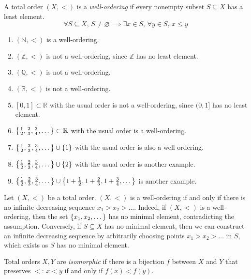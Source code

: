 \begin{definition}
    A total order \( (X, <) \) is a \emph{well-ordering} if every nonempty subset \( S \subseteq X \) has a least element.
    \[ \forall S \subseteq X,\, S \neq \varnothing \implies \exists x \in S,\, \forall y \in S,\, x \leq y \]
\end{definition}
\begin{example}
    \begin{enumerate}
        \item \( (\mathbb N, <) \) is a well-ordering.
        \item \( (\mathbb Z, <) \) is not a well-ordering, since \( \mathbb Z \) has no least element.
        \item \( (\mathbb Q, <) \) is not a well-ordering.
        \item \( (\mathbb R, <) \) is not a well-ordering.
        \item \( [0,1] \subset \mathbb R \) with the usual order is not a well-ordering, since \( (0,1] \) has no least element.
        \item \( \qty{\frac{1}{2}, \frac{2}{3}, \frac{3}{4}, \dots} \subset \mathbb R \) with the usual order is a well-ordering.
        \item \( \qty{\frac{1}{2}, \frac{2}{3}, \frac{3}{4}, \dots} \cup \qty{1} \) with the usual order is also a well-ordering.
        \item \( \qty{\frac{1}{2}, \frac{2}{3}, \frac{3}{4}, \dots} \cup \qty{2} \) with the usual order is another example.
        \item \( \qty{\frac{1}{2}, \frac{2}{3}, \frac{3}{4}, \dots} \cup \qty{1 + \frac{1}{2}, 1 + \frac{2}{3}, 1 + \frac{3}{4}, \dots} \) is another example.
    \end{enumerate}
\end{example}
\begin{remark}
    Let \( (X, <) \) be a total order.
    \( (X, <) \) is a well-ordering if and only if there is no infinite decreasing sequence \( x_1 > x_2 > \dots \).
    Indeed, if \( (X, <) \) is a well-ordering, then the set \( \qty{x_1, x_2, \dots} \) has no minimal element, contradicting the assumption.
    Conversely, if \( S \subseteq X \) has no minimal element, then we can construct an infinite decreasing sequence by arbitrarily choosing points \( x_1 > x_2 > \dots \) in \( S \), which exists as \( S \) has no minimal element.
\end{remark}
\begin{definition}
    Total orders \( X, Y \) are \emph{isomorphic} if there is a bijection \( f \) between \( X \) and \( Y \) that preserves \( < \): \( x < y \) if and only if \( f(x) < f(y) \).
\end{definition}
